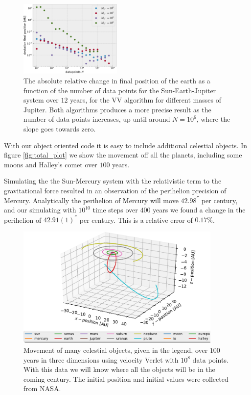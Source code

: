 \documentclass[%
 reprint,
nofootinbib,
aps,
]{revtex4-1}
\begin{document}
\begin{figure}
  \centering
  \includegraphics[width=0.45\textwidth]{../figures/change_position_MJ.pdf}
  \caption{The absolute relative change in final position of the earth as a function of the number of data points for the Sun-Earth-Jupiter system over $12$ years, for the VV algorithm for different masses of Jupiter. Both algorithms produces a more precise result as the number of data points increases, up until around $N=10^6$, where the slope goes towards zero.}
  \label{fig:change_position_MJ}
\end{figure}

With our object oriented code it is easy to include additional celestial objects. In figure \vref{fig:total_plot} we show the movement off all the planets, including some moons and Halley's comet over $100$ years.

Simulating the the Sun-Mercury system with the relativistic term to the gravitational force resulted in an observation of the perihelion precision of Mercury. Analytically the perihelion of Mercury will move $42.98^{''}$ per century, and our simulating with $10^{10}$ time steps over $400$ years we found a change in the perihelion of $42.91(1)^{''}$ per century. This is a relative error of $0.17\%$.

\begin{figure}
  \centering
  \includegraphics[width=0.9\textwidth]{../figures/total_plot.pdf}
  \caption{Movement of many celestial objects, given in the legend, over $100$ years in three dimensions using velocity Verlet with $10^8$ data points. With this data we will know where all the objects will be in the coming century. The initial position and initial values were collected from NASA.}
  \label{fig:total_plot}
\end{figure}
\end{document}
